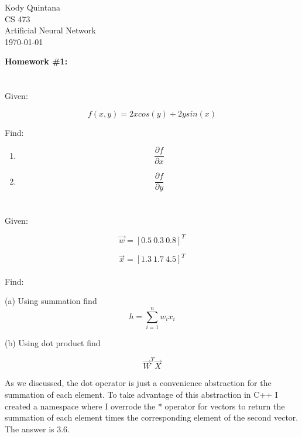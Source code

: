\documentclass[14pt]{article}
\newcommand{\question}{\begin{tcolorbox}[boxrule=0.5pt, colback=backgrey, colframe=bordergrey, sharpish corners]\subsection{}}
\newcommand{\closequestion}{\end{tcolorbox}}
\begin{document}
\begin{flushleft}
 
\large
Kody Quintana\\
CS 473\\
Artificial Neural Network\\
\today\\
\boldmath

\begin{center}
\textbf{Homework \#1:}
\end{center}

\section{}
\question
Given:

$$
f(x,y) = 2x cos(y) + 2y sin(x)
$$

Find:

\begin{enumerate}[label=(\alph*)]
\item$$
\frac
	{\partial f}
	{\partial x}
$$

\item$$
\frac
	{\partial f}
	{\partial y}
$$
\end{enumerate}
\closequestion


\section{}
\question
Given:

$$
\vec{w} = [0.5\ 0.3\ 0.8]^T
$$

$$
\vec{x} = [1.3\ 1.7\ 4.5]^T
$$
\\[1\baselineskip]

Find:

(a) Using summation find 
$$
h=\sum_{i=1}^{n} w_i x_i
$$

(b)
Using dot product find

$$
\vec{W}^T \vec{X}
$$
\closequestion
{}
As we discussed, the dot operator is just a convenience abstraction for the summation of each element.
To take advantage of this abstraction in C++ I created a namespace where I overrode the * operator for vectors to return the summation of each element times the corresponding element of the second vector.
The answer is 3.6.


\end{flushleft}
\end{document}
